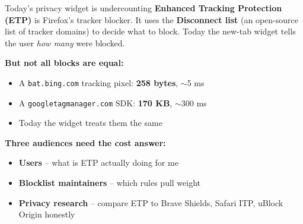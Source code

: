 \documentclass[10pt,aspectratio=169]{beamer}
\begin{document}
\begin{frame}{Today's privacy widget is undercounting}
    \textbf{Enhanced Tracking Protection (ETP)} is Firefox's tracker blocker. It uses the \textbf{Disconnect list} (an open-source list of tracker domains) to decide what to block. Today the new-tab widget tells the user \textit{how many} were blocked.

    \vspace{0.6em}
    \textbf{But not all blocks are equal:}
    \begin{itemize}
        \item A \texttt{bat.bing.com} tracking pixel: \textbf{258 bytes}, $\sim$5 ms
        \item A \texttt{googletagmanager.com} SDK: \textbf{170 KB}, $\sim$300 ms
        \item Today the widget treats them the same
    \end{itemize}

    \vspace{0.8em}
    \textbf{Three audiences need the cost answer:}
    \begin{itemize}
        \item \textbf{Users} -- what is ETP actually doing for me
        \item \textbf{Blocklist maintainers} -- which rules pull weight
        \item \textbf{Privacy research} -- compare ETP to Brave Shields, Safari ITP, uBlock Origin honestly
    \end{itemize}
\end{frame}
\end{document}
